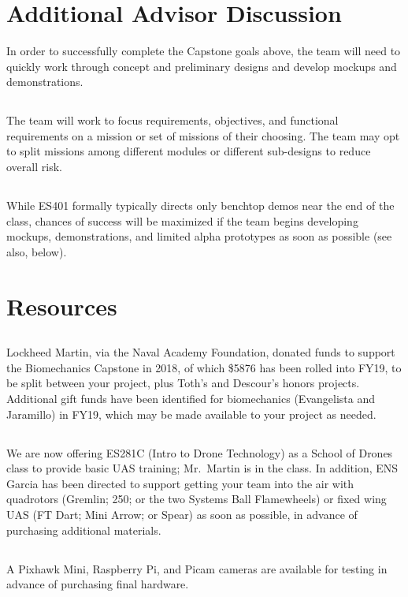 \documentclass[10pt,courier]{navymemo}
\begin{document}
\section{Additional Advisor Discussion} In order to successfully complete the Capstone goals above, the team will need to quickly work through concept and preliminary designs and develop mockups and demonstrations. 
\subsection{} The team will work to focus requirements, objectives, and functional requirements on a mission or set of missions of their choosing. The team may opt to split missions among different modules or different sub-designs to reduce overall risk. 
\subsection{} While ES401 formally typically directs only benchtop demos near the end of the class, chances of success will be maximized if the team begins developing mockups, demonstrations, and limited alpha prototypes as soon as possible (see also, below). 

\section{Resources} 
\subsection{} Lockheed Martin, via the Naval Academy Foundation, donated funds to support the Biomechanics Capstone in 2018, of which \$5876 has been rolled into FY19, to be split between your project, plus Toth's and Descour's honors projects. Additional gift funds have been identified for biomechanics (Evangelista and Jaramillo) in FY19, which may be made available to your project as needed. 
\subsection{} We are now offering ES281C (Intro to Drone Technology) as a School of Drones class to provide basic UAS training; Mr.~Martin is in the class. In addition, ENS Garcia has been directed to support getting your team into the air with quadrotors (Gremlin; 250; or the two Systems Ball Flamewheels) or fixed wing UAS (FT Dart; Mini Arrow; or Spear) as soon as possible, in advance of purchasing additional materials. 
\subsection{} A Pixhawk Mini, Raspberry Pi, and Picam cameras are available for testing in advance of purchasing final hardware. 
\end{document}
